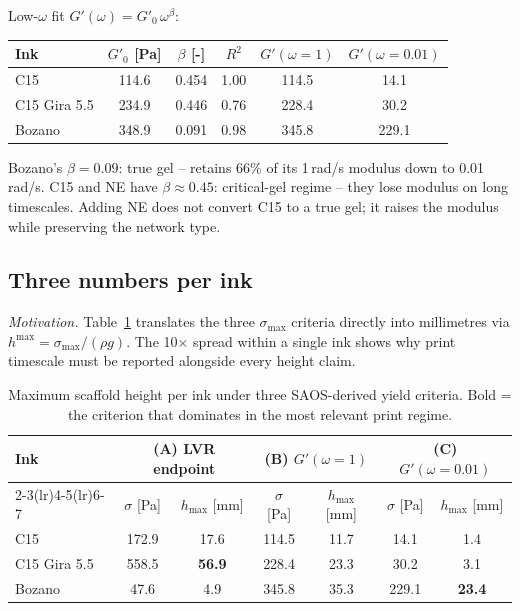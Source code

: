 \documentclass[11pt,a4paper]{article}
\begin{document}
\begin{examplebox}
Low-$\omega$ fit $G'(\omega)=G'_0\,\omega^\beta$:

\medskip\centering
\begin{tabular}{lccccc}
\toprule
Ink & $G'_0$ [\si{\Pa}] & $\beta$ [-] & $R^2$ & $G'(\omega=1)$ & $G'(\omega=0.01)$ \\
\midrule
C15           & 114.6 & 0.454 & 1.00 & 114.5 & 14.1  \\
C15 Gira 5.5  & 234.9 & 0.446 & 0.76 & 228.4 & 30.2  \\
Bozano        & 348.9 & 0.091 & 0.98 & 345.8 & 229.1 \\
\bottomrule
\end{tabular}

\medskip\flushleft
Bozano's $\beta=0.09$: true gel -- retains 66\% of its 1\,\si{\radian/s}
modulus down to 0.01\,\si{\radian/s}. C15 and NE have $\beta\approx
0.45$: critical-gel regime -- they lose modulus on long timescales.
Adding NE does not convert C15 to a true gel; it raises the modulus
while preserving the network type.
\end{examplebox}

\subsection{Three numbers per ink}

\emph{Motivation.}
Table~\ref{tab:hmax_three_criteria} translates the three $\sigma_\mathrm{max}$
criteria directly into millimetres via $h^{\max}=\sigma_\mathrm{max}/(\rho g)$.
The 10$\times$ spread within a single ink shows why print timescale must
be reported alongside every height claim.

\begin{table}[h]
\centering\small
\begin{tabular}{lcccccc}
\toprule
\multirow{2}{*}{Ink}
 & \multicolumn{2}{c}{(A) LVR endpoint}
 & \multicolumn{2}{c}{(B) $G'(\omega=1)$}
 & \multicolumn{2}{c}{(C) $G'(\omega=0.01)$} \\
\cmidrule(lr){2-3}\cmidrule(lr){4-5}\cmidrule(lr){6-7}
 & $\sigma$ [\si{\Pa}] & $h_\mathrm{max}$ [\si{\mm}]
 & $\sigma$ [\si{\Pa}] & $h_\mathrm{max}$ [\si{\mm}]
 & $\sigma$ [\si{\Pa}] & $h_\mathrm{max}$ [\si{\mm}] \\
\midrule
C15           & 172.9 & 17.6 & 114.5 & 11.7 & 14.1  & 1.4  \\
C15 Gira 5.5  & 558.5 & \textbf{56.9} & 228.4 & 23.3 & 30.2 & 3.1  \\
Bozano        & 47.6  & 4.9  & 345.8 & 35.3 & 229.1 & \textbf{23.4} \\
\bottomrule
\end{tabular}
\caption{Maximum scaffold height per ink under three SAOS-derived yield
criteria. Bold = the criterion that dominates in the most relevant print
regime.}
\label{tab:hmax_three_criteria}
\end{table}
\end{document}
